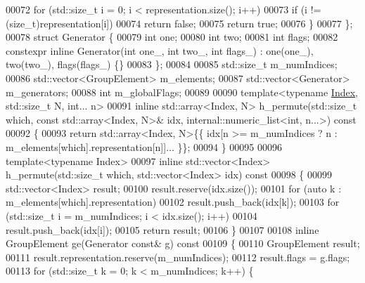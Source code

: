\begin{DoxyCode}
00072         \textcolor{keywordflow}{for} (std::size\_t i = 0; i < representation.size(); i++)
00073           \textcolor{keywordflow}{if} (i != (\textcolor{keywordtype}{size\_t})representation[i])
00074             \textcolor{keywordflow}{return} \textcolor{keyword}{false};
00075         \textcolor{keywordflow}{return} \textcolor{keyword}{true};
00076       \}
00077     \};
00078     \textcolor{keyword}{struct }Generator \{
00079       \textcolor{keywordtype}{int} one;
00080       \textcolor{keywordtype}{int} two;
00081       \textcolor{keywordtype}{int} flags;
00082       constexpr \textcolor{keyword}{inline} Generator(\textcolor{keywordtype}{int} one\_, \textcolor{keywordtype}{int} two\_, \textcolor{keywordtype}{int} flags\_) : one(one\_), two(two\_), flags(flags\_) \{\}
00083     \};
00084 
00085     std::size\_t m\_numIndices;
00086     std::vector<GroupElement> m\_elements;
00087     std::vector<Generator> m\_generators;
00088     \textcolor{keywordtype}{int} m\_globalFlags;
00089 
00090     \textcolor{keyword}{template}<\textcolor{keyword}{typename} \hyperlink{namespace_eigen_a62e77e0933482dafde8fe197d9a2cfde}{Index}, std::size\_t N, \textcolor{keywordtype}{int}... n>
00091     \textcolor{keyword}{inline} std::array<Index, N> h\_permute(std::size\_t which, \textcolor{keyword}{const} std::array<Index, N>& idx, 
      internal::numeric\_list<int, n...>)\textcolor{keyword}{ const}
00092 \textcolor{keyword}{    }\{
00093       \textcolor{keywordflow}{return} std::array<Index, N>\{\{ idx[n >= m\_numIndices ? n : m\_elements[which].representation[n]]... \}\};
00094     \}
00095 
00096     \textcolor{keyword}{template}<\textcolor{keyword}{typename} Index>
00097     \textcolor{keyword}{inline} std::vector<Index> h\_permute(std::size\_t which, std::vector<Index> idx)\textcolor{keyword}{ const}
00098 \textcolor{keyword}{    }\{
00099       std::vector<Index> result;
00100       result.reserve(idx.size());
00101       \textcolor{keywordflow}{for} (\textcolor{keyword}{auto} k : m\_elements[which].representation)
00102         result.push\_back(idx[k]);
00103       \textcolor{keywordflow}{for} (std::size\_t i = m\_numIndices; i < idx.size(); i++)
00104         result.push\_back(idx[i]);
00105       \textcolor{keywordflow}{return} result;
00106     \}
00107 
00108     \textcolor{keyword}{inline} GroupElement ge(Generator \textcolor{keyword}{const}& g)\textcolor{keyword}{ const}
00109 \textcolor{keyword}{    }\{
00110       GroupElement result;
00111       result.representation.reserve(m\_numIndices);
00112       result.flags = g.flags;
00113       \textcolor{keywordflow}{for} (std::size\_t k = 0; k < m\_numIndices; k++) \{

\end{DoxyCode}
